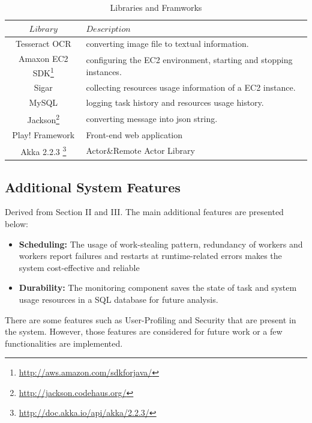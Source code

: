 \documentclass[conference]{IEEEtran}
\begin{document}
\begin{savenotes}
\begin{table}
\renewcommand{\arraystretch}{1.3}
\caption{Libraries and Framworks}\label{tab:syslib}
\centering
\begin{tabular*}{8cm}{c|p{5cm}}
    \hline
    $Library$&$Description$\\
    \hline
    Tesseract OCR \cite{tess} & converting image file to textual information. \\
    Amaxon EC2 SDK\footnote{\url{http://aws.amazon.com/sdkforjava/}}& configuring the EC2 environment, starting and stopping instances. \\
    Sigar & collecting resources usage information of a EC2 instance. \\
    MySQL  & logging task history and resources usage history. \\
    Jackson\footnote{\url{http://jackson.codehaus.org/}}  & converting message into json string. \\
    Play! Framework & Front-end web application \\
    Akka 2.2.3 \footnote{\url{http://doc.akka.io/api/akka/2.2.3/}} & Actor\&Remote Actor Library \\

    \hline
\end{tabular*}
\end{table}
\end{savenotes}

\subsection{Additional System Features}
\noindent
Derived from Section II and III. The main additional features are presented below:

\begin{itemize}
  \item \textbf{Scheduling:} The usage of work-stealing pattern, redundancy of workers and workers report failures and restarts at runtime-related errors makes the system cost-effective and reliable
  \item \textbf{Durability:} The monitoring component saves the state of task and system usage resources in a SQL database for future analysis.  
\end{itemize} 

There are some features such as User-Profiling and Security that are present in the system. However, those features are considered for future work or a few functionalities are implemented.  
\end{document}
